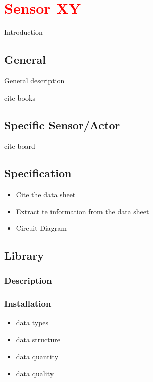 %
%

\chapter{\textcolor{red}{Sensor XY}}

Introduction

\section{General}

General description

cite books

\section{Specific Sensor/Actor}

cite board

\section{Specification}

\begin{itemize}
  \item Cite the data sheet
  \item Extract te information from the data sheet
  \item Circuit Diagram
\end{itemize}

\section{Library}

\subsection{Description}

\subsection{Installation}

\begin{itemize}
    \item data types
    \item data structure
    \item data quantity
    \item data quality
\end{itemize}

